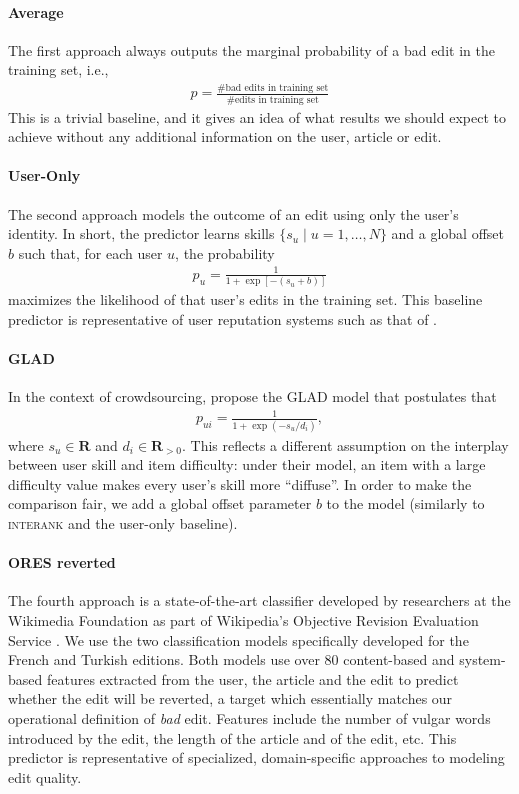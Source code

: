 \documentclass[format=sigconf]{acmart}
\begin{document}
\paragraph{Average}
The first approach always outputs the marginal probability of a bad edit in the training set, i.e.,
\begin{align*}
p = \frac{\text{\# bad edits in training set}}{\text{\# edits in training set}}
\end{align*}
This is a trivial baseline, and it gives an idea of what results we should expect to achieve without any additional information on the user, article or edit.

\paragraph{User-Only}
The second approach models the outcome of an edit using only the user's identity.
In short, the predictor learns skills $\{s_u \mid u = 1, \ldots, N\}$ and a global offset $b$ such that, for each user $u$, the probability
\begin{align*}
p_u = \frac{1}{1 + \exp[- (s_u + b)]}
\end{align*}
maximizes the likelihood of that user's edits in the training set.
This baseline predictor is representative of user reputation systems such as that of \citet{adler2007content}.

\paragraph{GLAD}
In the context of crowdsourcing, \citet{whitehill2009whose} propose the GLAD model that postulates that
\begin{align*}
p_{ui} = \frac{1}{1 + \exp(- s_u / d_i)},
\end{align*}
where $s_u \in \mathbf{R}$ and $d_i \in \mathbf{R}_{>0}$.
This reflects a different assumption on the interplay between user skill and item difficulty: under their model, an item with a large difficulty value makes every user's skill more ``diffuse''.
In order to make the comparison fair, we add a global offset parameter $b$ to the model (similarly to \textsc{interank} and the user-only baseline).

\paragraph{ORES reverted}
The fourth approach is a state-of-the-art classifier developed by researchers at the Wikimedia Foundation as part of Wikipedia's Objective Revision Evaluation Service \citep{wikimedia2015artificial}.
We use the two classification models specifically developed for the French and Turkish editions.
Both models use over \num{80} content-based and system-based features extracted from the user, the article and the edit to predict whether the edit will be reverted, a target which essentially matches our operational definition of \emph{bad} edit.
Features include the number of vulgar words introduced by the edit, the length of the article and of the edit, etc.
This predictor is representative of specialized, domain-specific approaches to modeling edit quality.
\end{document}
